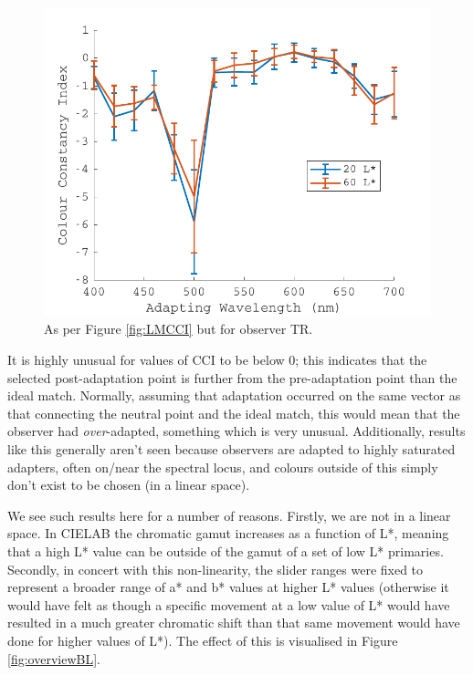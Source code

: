 \begin{figure}[htbp]
\includegraphics[max width=\textwidth]{figs/LargeSphere/TRCCI.pdf}
\caption{As per Figure \ref{fig:LMCCI} but for observer TR.}
\label{fig:TRCCI}
\end{figure}

It is highly unusual for values of \gls{CCI} to be below 0; this indicates that the selected post-adaptation point is further from the pre-adaptation point than the ideal match. Normally, assuming that adaptation occurred on the same vector as that connecting the neutral point and the ideal match, this would mean that the observer had \emph{over}-adapted, something which is very unusual. Additionally, results like this generally aren't seen because observers are adapted to highly saturated adapters, often on/near the spectral locus, and colours outside of this simply don't exist to be chosen (in a linear space). 

We see such results here for a number of reasons. Firstly, we are not in a linear space. In CIELAB the chromatic gamut increases as a function of L*, meaning that a high L* value can be outside of the gamut of a set of low L* primaries. Secondly, in concert with this non-linearity, the slider ranges were fixed to represent a broader range of a* and b* values at higher L* values (otherwise it would have felt as though a specific movement at a low value of L* would have resulted in a much greater chromatic shift than that same movement would have done for higher values of L*). The effect of this is visualised in Figure \ref{fig:overviewBL}.

